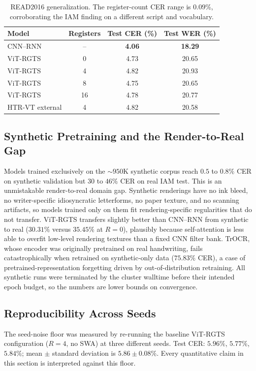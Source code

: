 \begin{table}[h]
\centering
\small
\caption{READ2016 generalization. The register-count CER range is $0.09\%$, corroborating the IAM finding on a different script and vocabulary.}
\label{tab:read2016}
\begin{tabular}{lccc}
\toprule
Model & Registers & Test CER (\%) & Test WER (\%) \\
\midrule
CNN--RNN               & --  & \textbf{4.06} & \textbf{18.29} \\
ViT-RGTS               & 0   & 4.73          & 20.65 \\
ViT-RGTS               & 4   & 4.82          & 20.93 \\
ViT-RGTS               & 8   & 4.75          & 20.65 \\
ViT-RGTS               & 16  & 4.78          & 20.77 \\
HTR-VT external        & 4   & 4.82          & 20.58 \\
\bottomrule
\end{tabular}
\end{table}

\subsection{Synthetic Pretraining and the Render-to-Real Gap}
\label{sec:res_synth}

Models trained exclusively on the ${\sim}950$K synthetic corpus reach $0.5$ to $0.8\%$ CER on synthetic validation but $30$ to $46\%$ CER on real IAM test. This is an unmistakable render-to-real domain gap. Synthetic renderings have no ink bleed, no writer-specific idiosyncratic letterforms, no paper texture, and no scanning artifacts, so models trained only on them fit rendering-specific regularities that do not transfer. ViT-RGTS transfers slightly better than CNN--RNN from synthetic to real ($30.31\%$ versus $35.45\%$ at $R = 0$), plausibly because self-attention is less able to overfit low-level rendering textures than a fixed CNN filter bank. TrOCR, whose encoder was originally pretrained on real handwriting, fails catastrophically when retrained on synthetic-only data ($75.83\%$ CER), a case of pretrained-representation forgetting driven by out-of-distribution retraining. All synthetic runs were terminated by the cluster walltime before their intended epoch budget, so the numbers are lower bounds on convergence.

\subsection{Reproducibility Across Seeds}
\label{sec:res_seeds}

The seed-noise floor was measured by re-running the baseline ViT-RGTS configuration ($R = 4$, no SWA) at three different seeds. Test CER: $5.96\%$, $5.77\%$, $5.84\%$; mean $\pm$ standard deviation is $5.86 \pm 0.08\%$. Every quantitative claim in this section is interpreted against this floor.

